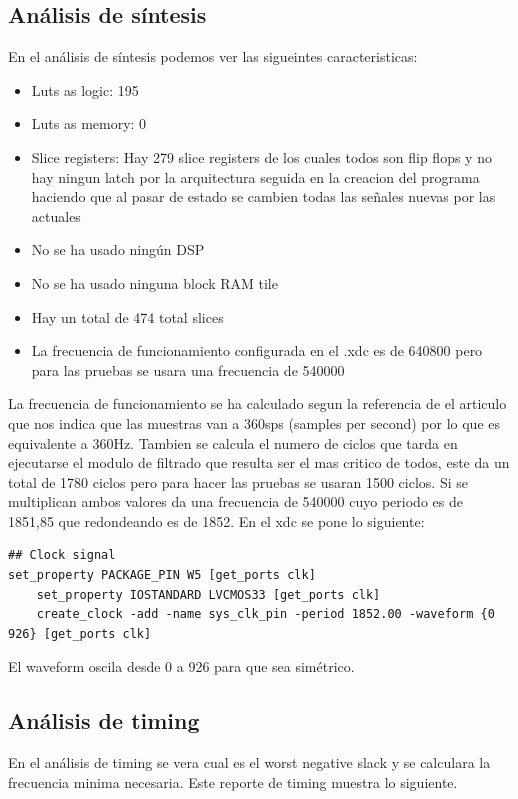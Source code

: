 \subsection{Análisis de síntesis}

	En el análisis de síntesis podemos ver las sigueintes caracteristicas:

	\begin{itemize}
		\item Luts as logic: 195
		\item Luts as memory: 0
		\item Slice registers: Hay 279 slice registers de los cuales todos son flip flops y no hay ningun latch por la arquitectura 
		seguida en la creacion del programa haciendo que al pasar de estado se cambien todas las señales nuevas por las actuales
		\item No se ha usado ningún DSP
		\item No se ha usado ninguna block RAM tile
		\item Hay un total de 474 total slices
		\item La frecuencia de funcionamiento configurada en el .xdc es de 640800 pero para las pruebas se usara una frecuencia de 540000
	\end{itemize}

	La frecuencia de funcionamiento se ha calculado segun la referencia de el articulo \cite{desai2021low} que nos indica que las muestras van a 360sps (samples per second) 
	por lo que es equivalente a 360Hz. Tambien se calcula el numero de ciclos que tarda en ejecutarse el modulo de filtrado que resulta ser el mas critico 
	de todos, este da un total de 1780 ciclos pero para hacer las pruebas se usaran 1500 ciclos. Si se multiplican ambos valores da una frecuencia de 540000 
	cuyo periodo es de 1851,85 que redondeando es de 1852. En el xdc se pone lo siguiente:

\lstset{language=VHDL, breaklines=true, basicstyle=\footnotesize}
\begin{lstlisting}[frame=single]
## Clock signal
set_property PACKAGE_PIN W5 [get_ports clk]							
	set_property IOSTANDARD LVCMOS33 [get_ports clk]
	create_clock -add -name sys_clk_pin -period 1852.00 -waveform {0 926} [get_ports clk]
\end{lstlisting}

El waveform oscila desde 0 a 926 para que sea simétrico.

\subsection{Análisis de timing}
	En el análisis de timing se vera cual es el worst negative slack y se calculara la frecuencia minima necesaria. Este reporte de timing muestra lo siguiente.

